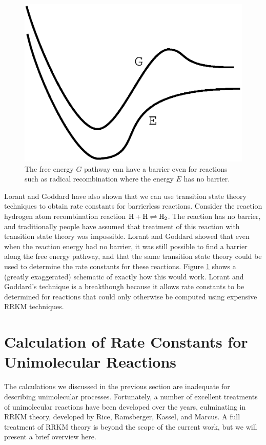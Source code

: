 \begin{figure}
\begin{center}
\includegraphics[scale=0.5]{h-recomb.eps}
\end{center}
\caption{The free energy $G$ pathway can have a barrier even for
reactions such as radical recombination where the energy $E$ has no
barrier.}
\label{h-recomb}
\end{figure}

Lorant and Goddard have also shown that we can use transition state
theory techniques to obtain rate constants for barrierless
reactions. Consider the reaction hydrogen atom recombination reaction
$\mathrm{H} + \mathrm{H} \rightleftharpoons \mathrm{H_2}$. The reaction has
no barrier, and traditionally people have assumed that treatment of
this reaction with transition state theory was impossible. Lorant and
Goddard showed that even when the reaction energy had no barrier, it
was still possible to find a barrier along the free energy pathway,
and that the same transition state theory could be used to determine
the rate constants for these reactions. Figure \ref{h-recomb} shows a
(greatly exaggerated) schematic of exactly how this would work. Lorant
and Goddard's technique is a breakthough because it allows rate
constants to be determined for reactions that could only otherwise be
computed using expensive RRKM techniques.

\section{Calculation of Rate Constants for Unimolecular Reactions}
The calculations we discussed in the previous section are
inadequate for describing unimolecular processes. Fortunately, a
number of excellent treatments of unimolecular reactions have been
developed over the years, culminating in RRKM theory, developed by
Rice, Ramsberger, Kassel, and Marcus. A full treatment of RRKM theory
is beyond the scope of the current work, but we will present a brief
overview here.

